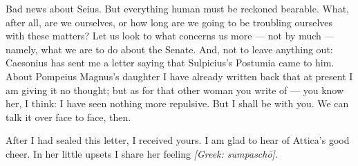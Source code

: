 

Bad news about Seius. But everything human must be reckoned bearable. What, after all, are we ourselves, or how long are we going to be troubling ourselves with these matters? Let us look to what concerns us more --- not by much --- namely, what we are to do about the Senate. And, not to leave anything out: Caesonius has sent me a letter saying that Sulpicius's Postumia came to him. About Pompeius Magnus's daughter I have already written back that at present I am giving it no thought; but as for that other woman you write of --- you know her, I think: I have seen nothing more repulsive. But I shall be with you. We can talk it over face to face, then. \par
After I had sealed this letter, I received yours. I am glad to hear of Attica's good cheer. In her little upsets I share her feeling \textit{[Greek: sumpasch\=o]}.

